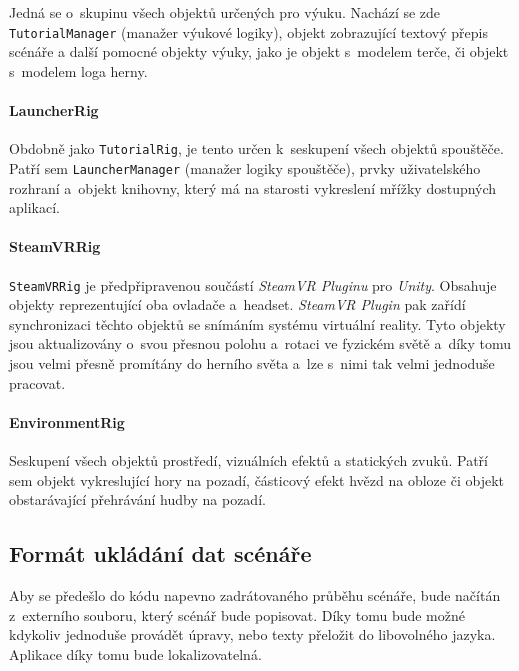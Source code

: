 Jedná se o~skupinu všech objektů určených pro výuku. Nachází se zde
\texttt{TutorialManager} (manažer výukové logiky), objekt zobrazující textový přepis scénáře a
další pomocné objekty výuky, jako je objekt s~modelem terče, či objekt
s~modelem loga herny.

\paragraph{LauncherRig}\label{launcherrig}

Obdobně jako \texttt{TutorialRig}, je tento určen k~seskupení všech
objektů spouštěče. Patří sem \texttt{LauncherManager} (manažer logiky spouštěče), prvky
uživatelského rozhraní a~objekt knihovny, který má na starosti
vykreslení mřížky dostupných aplikací.

\paragraph{SteamVRRig}\label{steamvrrig}

\texttt{SteamVRRig} je předpřipravenou součástí \emph{SteamVR Pluginu} pro
\emph{Unity}. Obsahuje objekty reprezentující oba ovladače a~headset.
\emph{SteamVR Plugin} pak zařídí synchronizaci těchto objektů se snímáním
systému virtuální reality. Tyto objekty jsou aktualizovány o~svou
přesnou polohu a~rotaci ve fyzickém světě a~díky tomu jsou velmi přesně
promítány do herního světa a~lze s~nimi tak velmi jednoduše pracovat.

\paragraph{EnvironmentRig}\label{environmentrig}

Seskupení všech objektů prostředí, vizuálních efektů a
statických zvuků. Patří sem objekt vykreslující hory na pozadí,
částicový efekt hvězd na obloze či objekt obstarávající přehrávání hudby
na pozadí.

\subsection{Formát ukládání dat
scénáře}\label{formuxe1t-ukluxe1duxe1nuxed-dat-scuxe9nuxe1ux159e}

Aby se předešlo do kódu napevno zadrátovaného průběhu scénáře, bude
načítán z~externího souboru, který scénář bude popisovat. Díky tomu bude
možné kdykoliv jednoduše provádět úpravy, nebo texty přeložit do
libovolného jazyka. Aplikace díky tomu bude lokalizovatelná.

